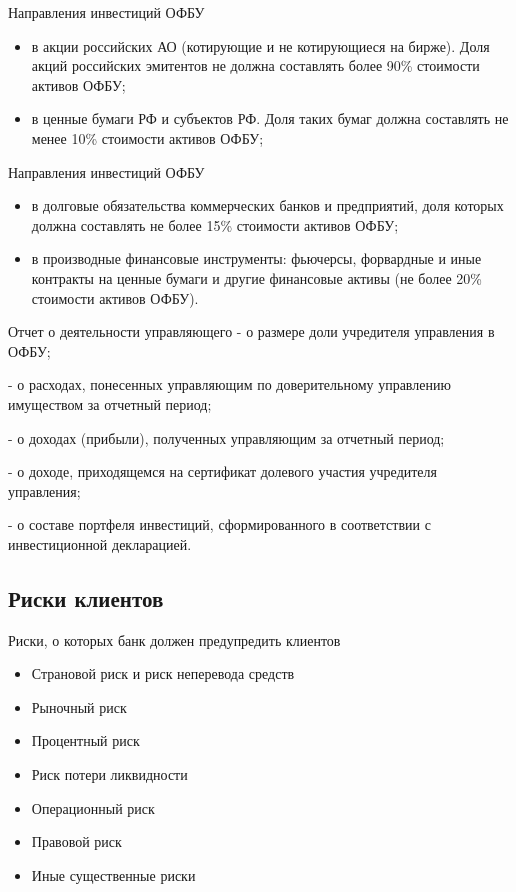 \documentclass[_Banking_p3.tex]{subfiles}
\begin{document}
\begin{frame}{Направления инвестиций ОФБУ}
\begin{itemize}[<+->]
\item
в акции российских АО (котирующие и не котирующиеся на бирже). Доля акций российских эмитентов не должна составлять более 90\% стоимости активов ОФБУ;
\item
в ценные бумаги РФ и субъектов РФ. Доля таких бумаг должна составлять не менее 10\% стоимости активов ОФБУ;
\end{itemize}
\end{frame}
\begin{frame}{Направления инвестиций ОФБУ}
\begin{itemize}[<+->]
\item
в долговые обязательства коммерческих банков и предприятий, доля которых должна составлять не более 15\% стоимости активов ОФБУ;
\item
в производные финансовые инструменты: фьючерсы, форвардные и иные контракты на ценные бумаги и другие финансовые активы (не более 20\% стоимости активов ОФБУ).

\end{itemize}
\end{frame}

\begin{frame}{Отчет о деятельности управляющего}
- о размере доли учредителя управления в ОФБУ;

- о расходах, понесенных управляющим по доверительному управлению имуществом за отчетный период;

- о доходах (прибыли), полученных управляющим за отчетный период;

- о доходе, приходящемся на сертификат долевого участия учредителя управления;

- о составе портфеля инвестиций, сформированного в соответствии с инвестиционной декларацией.

\end{frame}

\subsection{Риски клиентов}
\begin{frame} {Риски, о которых банк должен предупредить клиентов}
\begin{itemize}[<+->]
\item
Страновой риск и риск неперевода средств

\item
Рыночный риск

\item
Процентный риск

\item
Риск потери ликвидности

\item
Операционный риск

\item
Правовой риск

\item
Иные существенные риски

\end{itemize}

\end{frame}
\end{document}

